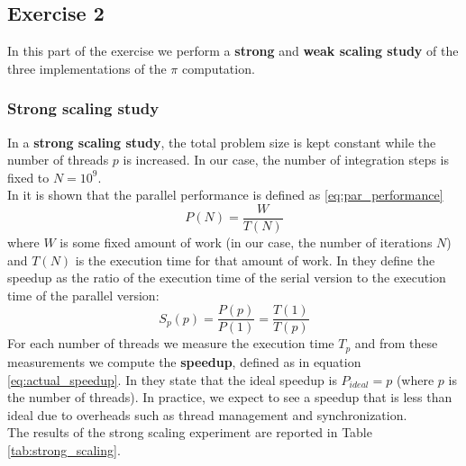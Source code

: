 \documentclass[unicode,10pt,a4paper,oneside,numbers=endperiod,openany]{scrartcl}
\begin{document}
\subsection{Exercise 2}

In this part of the exercise we perform a \textbf{strong} and \textbf{weak scaling study} of the three implementations of the $\pi$ computation.

\subsubsection{Strong scaling study}
In a \textbf{strong scaling study}, the total problem size is kept constant while the number of threads $p$ is increased. In our case, the number of integration steps is fixed to $N = 10^9$.\\
In \cite[p.~123]{hager2010hpc} it is shown that the parallel performance is defined as \ref{eq:par_performance}
\begin{equation}
  P(N) = \frac{W}{T(N)}
  \label{eq:par_performance}
\end{equation}
where $W$ is some fixed amount of work (in our case, the number of iterations $N$) and $T(N)$ is the execution time for that amount of work. In \cite[p.~124]{hager2010hpc} they define the speedup as the ratio of the execution time of the serial version to the execution time of the parallel version:
\begin{equation}
  S_p(p) = \frac{P(p)}{P(1)} = \frac{T(1)}{T(p)}
  \label{eq:actual_speedup}
\end{equation}
For each number of threads we measure the execution time $T_p$ and from these measurements we compute the \textbf{speedup}, defined as in equation \ref{eq:actual_speedup}.
In \cite[p.~124]{hager2010hpc} they state that the ideal speedup is  $P_{ideal} = p$ (where $p$ is the number of threads). In practice, we expect to see a speedup that is less than ideal due to overheads such as thread management and synchronization.\\
The results of the strong scaling experiment are reported in Table \ref{tab:strong_scaling}.
\end{document}
